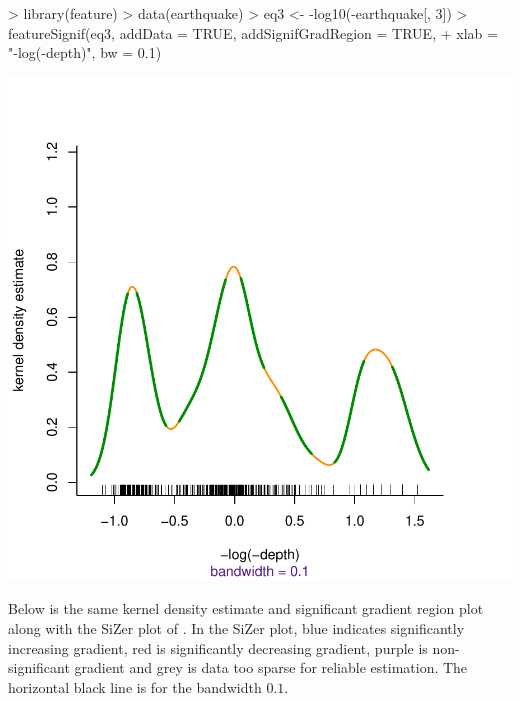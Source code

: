 \documentclass[a4paper,11pt]{article}
\begin{document}
\begin{center}
\begin{Schunk}
\begin{Sinput}
> library(feature)
> data(earthquake)
> eq3 <- -log10(-earthquake[, 3])
> featureSignif(eq3, addData = TRUE, addSignifGradRegion = TRUE, 
+     xlab = "-log(-depth)", bw = 0.1)
\end{Sinput}
\end{Schunk}
\includegraphics{feature-001}
\end{center}

Below is the same kernel density estimate and 
significant gradient region plot along with the SiZer plot of \citet*{chaudhuri99}.
In the SiZer plot, blue indicates significantly increasing gradient,
red is significantly decreasing gradient, purple is non-significant gradient
and grey is data too sparse for reliable estimation. The horizontal black line
is for the bandwidth $0.1$.
\end{document}
